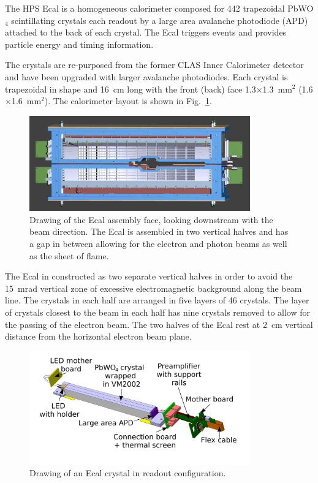 The HPS Ecal is a homogeneous calorimeter composed for 442 trapezoidal PbWO$_4$ scintillating crystals each readout by a large area avalanche photodiode (APD) attached to the back of each crystal. The Ecal triggers events and provides particle energy and timing information. 

The crystals are re-purposed from the former CLAS Inner Calorimeter detector and have been upgraded with larger avalanche photodiodes. Each crystal is trapezoidal in shape and 16~cm long with the front (back) face 1.3$\times$1.3~mm$^2$ (1.6$\times$1.6~mm$^2$). The calorimeter layout is shown in Fig.~\ref{Figure:ecalface}. 

\begin{figure}[thb]
  \centering
      \includegraphics[width=0.85\textwidth]{pics/experiment/ecalface.png}
  \caption[Drawing of the Ecal assembly face]{Drawing of the Ecal assembly face, looking downstream with the beam direction. The Ecal is assembled in two vertical halves and has a gap in between allowing for the electron and photon beams as well as the sheet of flame.}
  \label{Figure:ecalface}
\end{figure}

The Ecal in constructed as two separate vertical halves in order to avoid the 15~mrad vertical zone of excessive electromagnetic background along the beam line. The crystals in each half are arranged in five layers of 46 crystals. The layer of crystals closest to the beam in each half has nine crystals removed to allow for the passing of the electron beam. The two halves of the Ecal rest at 2~cm vertical distance from the  horizontal electron beam plane.

\begin{figure}[thb]
  \centering
      \includegraphics[width=0.85\textwidth]{pics/experiment/crystal.png}
  \caption[Single Ecal module]{Drawing of an Ecal crystal in readout configuration.}
  \label{Figure:crystal}
\end{figure}

